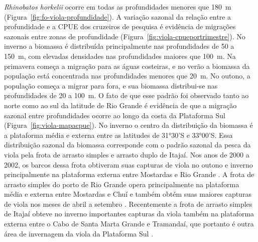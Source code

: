 \documentclass[a4paper,11pt,twoside,showtrims,onecolumn,openright,final]{memoir}
\begin{document}
\emph{Rhinobatos horkelii} ocorre em todas as profundidades menores que 180~m (Figura~\ref{fig:fo-viola-profundidade}). 
A variação sazonal da relação entre a profundidade e a CPUE dos cruzeiros 
de pesquisa é evidência de migrações sazonais entre zonas de profundidade (Figura~\ref{fig:viola-cpueportrimestre}). 
No inverno a biomassa é distribuída principalmente nas profundidades de 50 a 150~m, 
com elevadas densidades nas profundidades maiores que 100~m. Na primavera começa  
a migração para as águas costeiras, e no verão a biomassa da população está 
concentrada nas profundidades menores que 20~m. No outono, a população começa 
a migrar para fora, e sua biomassa distribui-se nas profundidades de 20 a 100~m. 
O fato de que esse padrão foi observado tanto ao norte como ao sul da latitude 
de Rio Grande é evidência de que a migração sazonal entre profundidades ocorre 
ao longo da costa da Plataforma Sul (Figura~\ref{fig:viola-mapacpue}). 
No inverno o centro da distribuição da biomassa é a plataforma média e externa 
entre as latitudes de 31°30'S e 33°00'S. Essa distribuição sazonal da biomassa 
corresponde com o padrão sazonal da pesca da viola pela frota de arrasto simples 
e arrasto duplo de Itajaí. Nos anos de 2000 a 2002, os barcos dessa frota obtiveram suas 
capturas de viola no outono e inverno principalmente na plataforma externa entre 
Mostardas e Rio Grande \citep{martins2003}. %
A frota de arrasto simples do porto de Rio Grande opera principalmente 
na plataforma média e externa entre Mostardas e Chuí e também obtém suas 
maiores capturas de viola nos meses de abril a setembro \citep[Capítulo~\ref{chap:pesca-industrial}]{miranda2003}. %
Recentemente a frota de arrasto simples de Itajaí obteve no inverno importantes 
capturas da viola também na plataforma externa entre o Cabo de Santa Marta Grande 
e Tramandaí, que portanto é outra área de invernagem 
da viola da Plataforma Sul \citep{martins2003}. %

%
%
\end{document}
